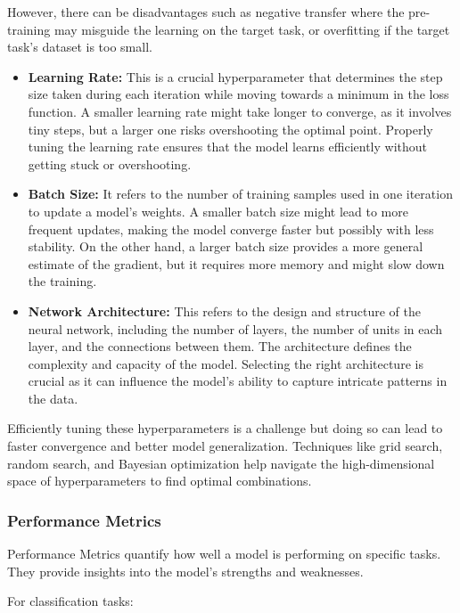 However, there can be disadvantages such as negative transfer where the pre-training may misguide the learning on the target task, or overfitting if the target task's dataset is too small.
\begin{itemize}
    \item \textbf{Learning Rate:} This is a crucial hyperparameter that determines the step size taken during each iteration while moving towards a minimum in the loss function. A smaller learning rate might take longer to converge, as it involves tiny steps, but a larger one risks overshooting the optimal point. Properly tuning the learning rate ensures that the model learns efficiently without getting stuck or overshooting.
    
    \item \textbf{Batch Size:} It refers to the number of training samples used in one iteration to update a model's weights. A smaller batch size might lead to more frequent updates, making the model converge faster but possibly with less stability. On the other hand, a larger batch size provides a more general estimate of the gradient, but it requires more memory and might slow down the training.
    
    \item \textbf{Network Architecture:} This refers to the design and structure of the neural network, including the number of layers, the number of units in each layer, and the connections between them. The architecture defines the complexity and capacity of the model. Selecting the right architecture is crucial as it can influence the model's ability to capture intricate patterns in the data.
\end{itemize}

Efficiently tuning these hyperparameters is a challenge but doing so can lead to faster convergence and better model generalization. Techniques like grid search, random search, and Bayesian optimization help navigate the high-dimensional space of hyperparameters to find optimal combinations.~\cite{Claesen2015HyperparameterSI}

\subsubsection*{Performance Metrics}

Performance Metrics quantify how well a model is performing on specific tasks. They provide insights into the model's strengths and weaknesses. 

For classification tasks:

